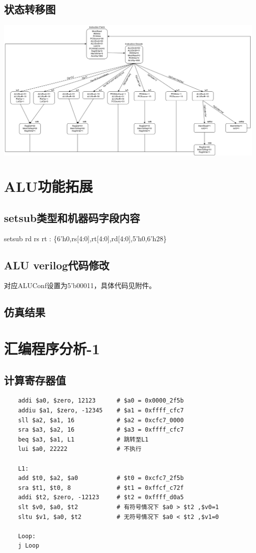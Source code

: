 \documentclass{article}
\begin{document}
\subsection{状态转移图}
\begin{center}
    \includegraphics[width = 18cm]{images/fsm.png}
\end{center}


\section{ALU功能拓展}
\subsection{setsub类型和机器码字段内容}
setsub rd rs rt : \{6'h0,rs[4:0],rt[4:0],rd[4:0],5'h0,6'h28\}
\subsection{ALU verilog代码修改}
对应ALUConf设置为5'b00011，具体代码见附件。
\subsection{仿真结果}


\section{汇编程序分析-1}
\subsection{计算寄存器值}
\begin{lstlisting}
    addi $a0, $zero, 12123      # $a0 = 0x0000_2f5b
    addiu $a1, $zero, -12345    # $a1 = 0xffff_cfc7
    sll $a2, $a1, 16            # $a2 = 0xcfc7_0000
    sra $a3, $a2, 16            # $a3 = 0xffff_cfc7
    beq $a3, $a1, L1            # 跳转至L1
    lui $a0, 22222              # 不执行

    L1:
    add $t0, $a2, $a0           # $t0 = 0xcfc7_2f5b
    sra $t1, $t0, 8             # $t1 = 0xffcf_c72f
    addi $t2, $zero, -12123     # $t2 = 0xffff_d0a5
    slt $v0, $a0, $t2           # 有符号情况下 $a0 > $t2 ,$v0=1
    sltu $v1, $a0, $t2          # 无符号情况下 $a0 < $t2 ,$v1=0

    Loop:
    j Loop
\end{lstlisting}
\end{document}
